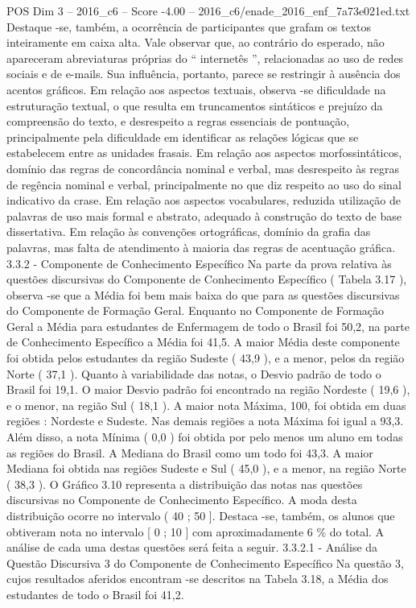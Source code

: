 \begin{textsample}{POS Dim 3 – 2016\_c6 – Score -4.00 – 2016\_c6/enade\_2016\_enf\_7a73e021ed.txt}
Destaque -se, também, a ocorrência de participantes que grafam os textos inteiramente em caixa alta.
Vale observar que, ao contrário do esperado, não apareceram abreviaturas próprias do “ internetês ”, relacionadas ao uso de redes sociais e de e-mails.
Sua influência, portanto, parece se restringir à ausência dos acentos gráficos.
Em relação aos aspectos textuais, observa -se dificuldade na estruturação textual, o que resulta em truncamentos sintáticos e prejuízo da compreensão do texto, e desrespeito a regras essenciais de pontuação, principalmente pela dificuldade em identificar as relações lógicas que se estabelecem entre as unidades frasais.
Em relação aos aspectos morfossintáticos, domínio das regras de concordância nominal e verbal, mas desrespeito às regras de regência nominal e verbal, principalmente no que diz respeito ao uso do sinal indicativo da crase.
Em relação aos aspectos vocabulares, reduzida utilização de palavras de uso mais formal e abstrato, adequado à construção do texto de base dissertativa.
Em relação às convenções ortográficas, domínio da grafia das palavras, mas falta de atendimento à maioria das regras de acentuação gráfica. 3.3.2 - Componente de Conhecimento Específico Na parte da prova relativa às questões discursivas do Componente de Conhecimento Específico ( Tabela 3.17 ), observa -se que a Média foi bem mais baixa do que para as questões discursivas do Componente de Formação Geral.
Enquanto no Componente de Formação Geral a Média para estudantes de Enfermagem de todo o Brasil foi 50,2, na parte de Conhecimento Específico a Média foi 41,5.
A maior Média deste componente foi obtida pelos estudantes da região Sudeste ( 43,9 ), e a menor, pelos da região Norte ( 37,1 ).
Quanto à variabilidade das notas, o Desvio padrão de todo o Brasil foi 19,1.
O maior Desvio padrão foi encontrado na região Nordeste ( 19,6 ), e o menor, na região Sul ( 18,1 ).
A maior nota Máxima, 100, foi obtida em duas regiões : Nordeste e Sudeste.
Nas demais regiões a nota Máxima foi igual a 93,3.
Além disso, a nota Mínima ( 0,0 ) foi obtida por pelo menos um aluno em todas as regiões do Brasil.
A Mediana do Brasil como um todo foi 43,3.
A maior Mediana foi obtida nas regiões Sudeste e Sul ( 45,0 ), e a menor, na região Norte ( 38,3 ).
O Gráfico 3.10 representa a distribuição das notas nas questões discursivas no Componente de Conhecimento Específico.
A moda desta distribuição ocorre no intervalo ( 40 ; 50 ].
Destaca -se, também, os alunos que obtiveram nota no intervalo [ 0 ; 10 ] com aproximadamente 6 \% do total.
A análise de cada uma destas questões será feita a seguir. 3.3.2.1 - Análise da Questão Discursiva 3 do Componente de Conhecimento Específico Na questão 3, cujos resultados aferidos encontram -se descritos na Tabela 3.18, a Média dos estudantes de todo o Brasil foi 41,2.

\end{textsample}
